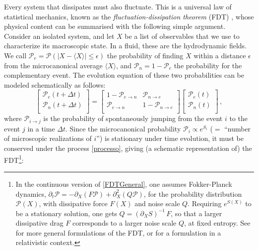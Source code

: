 \documentclass[a4paper, amsfonts, amssymb, amsmath, reprint, showkeys, nofootinbib, twoside,notitlepage,onecolumn]{revtex4-2}
\theoremstyle{definition}
\begin{document}
Every system that dissipates must also fluctuate. This is a universal law of statistical mechanics, known as the \textit{fluctuation-dissipation theorem} (FDT) \cite{landau5,Pathria2011}, whose physical content can be summarised with the following simple argument. 
Consider an isolated system, and let $X$ be a list of observables that we use to characterize its macroscopic state. In a fluid, these are the hydrodynamic fields. We call $\mathcal{P}_e=\mathcal{P}(|X{-}\langle X \rangle|\leq \epsilon)$ the probability of finding $X$ within a distance $\epsilon$ from the microcanonical average $\langle X \rangle$, and $\mathcal{P}_n=1-\mathcal{P}_e$ the probability for the complementary event. The evolution equation of these two probabilities can be modeled schematically as follows:
\begin{equation}\label{processo}
\begin{bmatrix}
 \mathcal{P}_e(t{+}\Delta t) \\
 \mathcal{P}_n(t{+}\Delta t) \\
\end{bmatrix}
=
\begin{bmatrix}
  1{-}\mathcal{P}_{e\rightarrow n}  &  \mathcal{P}_{n\rightarrow e} \\
  \mathcal{P}_{e\rightarrow n} &   1{-}\mathcal{P}_{n\rightarrow e} \\
\end{bmatrix}
\begin{bmatrix}
 \mathcal{P}_e(t) \\
 \mathcal{P}_n(t) \\
\end{bmatrix} \, ,
\end{equation}
where $\mathcal{P}_{i\rightarrow j}$ is the probability of spontaneously jumping from the event $i$ to the event $j$ in a time $\Delta t$. Since the microcanonical probability $\mathcal{P}_i\propto e^{S_i}$ ($=$ ``number of microscopic realizations of $i$'') is stationary under time evolution, it must be conserved under the process \eqref{processo}, giving (a schematic representation of) the FDT\footnote{In the continuous version of \eqref{FDTGeneral}, one assumes Fokker-Planck dynamics, $\partial_t \mathcal{P}{=}{-}\partial_X(F\mathcal{P}){+}\partial^2_X(Q\mathcal{P})$, for the probability distribution $\mathcal{P}(X)$, with dissipative force $F(X)$ and noise scale $Q$. Requiring $e^{S(X)}$ to be a stationary solution, one gets $Q=(\partial_X S)^{-1} \, F$, so that a larger dissipative drag $F$ corresponds to a larger noise scale $Q$, at fixed entropy. See \cite{Kubo:1966fyg} for more general formulations of the FDT, or \cite{Calzetta:1997aj} for a formulation in a relativistic context.}: 
\end{document}
